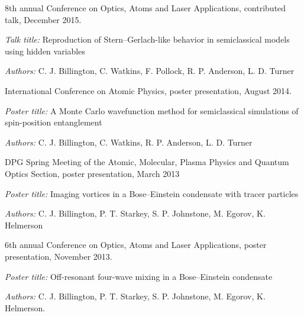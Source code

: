 \documentclass[10pt,a4paper]{article}
\renewenvironment{itemize}{
  \begin{list}{}{
    \setlength{\leftmargin}{1.5em}
    \setlength{\itemsep}{0.25em}
    \setlength{\parskip}{0pt}
    \setlength{\parsep}{0.25em}
  }
}{
  \end{list}
}
\begin{document}
\begin{itemize}


\item 8th annual Conference on Optics, Atoms and Laser Applications, contributed talk, December 2015.
   \begin{itemize}
      \item \textit{Talk title:}
      Reproduction of Stern--Gerlach-like behavior in semiclassical models using hidden variables
      \item\textit{Authors:}
      C. J. Billington, C. Watkins, F. Pollock, R. P. Anderson, L. D. Turner
    \end{itemize}

\item International Conference on Atomic Physics, poster presentation, August 2014.
   \begin{itemize}
      \item \textit{Poster title:}
      A Monte Carlo wavefunction method for semiclassical simulations of spin-position entanglement
      \item\textit{Authors:}
      C. J. Billington, C. Watkins, R. P. Anderson, L. D. Turner
    \end{itemize}

\item DPG Spring Meeting of the Atomic, Molecular, Plasma Physics and Quantum Optics Section, poster presentation, March 2013
  \begin{itemize}
      \item \textit{Poster title:}
      Imaging vortices in a Bose--Einstein condensate with tracer particles
      \item\textit{Authors:}
      C. J. Billington, P. T. Starkey, S. P. Johnstone, M. Egorov, K. Helmerson
    \end{itemize}

\item 6th annual Conference on Optics, Atoms and Laser Applications, poster presentation, November 2013.
   \begin{itemize}
      \item \textit{Poster title:}
      Off-resonant four-wave mixing in a Bose--Einstein condensate
      \item\textit{Authors:}
      C. J. Billington, P. T. Starkey, S. P. Johnstone, M. Egorov, K. Helmerson.
    \end{itemize}


\end{itemize}
\end{document}
